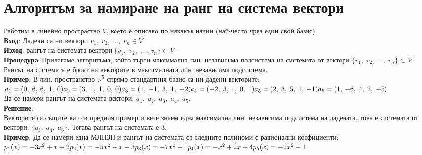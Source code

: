 \documentclass[12pt]{article}
\newcommand{\R}{\mathbb{R}}
\begin{document}
\section*{Алгоритъм за намиране на ранг на система вектори}

Работим в линейно простраство $V$, което е описано по някакъв начин
(най-често чрез един свой базис) \\

\textbf{Вход}: Дадени са ни вектори $v_1, \; v_2, \; \dots, \; v_n \in V$ \\

\textbf{Изход}: рангът на системата вектори $\{v_1, \; v_2, \; \dots, \; v_n\} \subset V$ \\

\textbf{Процедура}: Прилагаме алгоритъма, който търси максимална лин. независима подсистема на системата
от вектори $\{v_1, \; v_2, \; \dots, \; v_n\} \subset V$. Рангът на системата е броят на векторите
в максималната лин. независима подсистема. \\

\textbf{Пример}: В лин. пространство $\R^5$ спрямо стандартния базис са ни дадени векторите: \\

$a_1 = (0, \; 6, \; 6, \; 1, \; 0) \\
a_2 = (3, \; 1, \; 1, \; 0, \; 0) \\
a_3 = (1, \; -1, \; 3, \; 1, \; -2) \\
a_4 = (-2, \; 3, \; 1, \; 0, \; 1) \\
a_5 = (2, \; 3, \; 5, \; 1, \; -1) \\
a_6 = (1, \; -6, \; 4, \; 2, \; -5)$ \\

Да се намери рангът на системата вектори: $a_1, \; a_2, \; a_3, \; a_4, \; a_5$. \\

\textbf{Решение}: \\

Векторите са същите като в предния пример и вече знаем една максимална лин. независима подсистема
на дадената, това е системата от вектори: $\{a_3, \; a_4, \; a_6\}$. Тогава рангът на системата е $3$. \\

\textbf{Пример}: Да се намери една МЛНЗП и рангът на системата от следните полиноми с рационални коефициенти: \\

$p_1(x) = -3x^2  + x + 2 \\
p_2(x) = -5x^2 + x + 3 \\
p_3(x) = -7x^2 + 1 \\
p_4(x) = -x^2 + 2x + 4\\
p_5(x) = -2x^2 + 1$ \\
\end{document}

